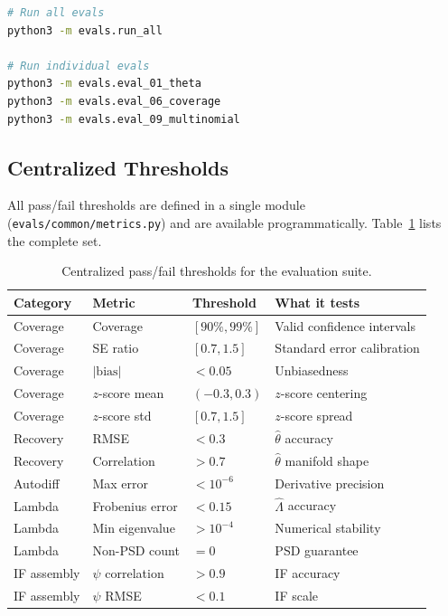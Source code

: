 \begin{lstlisting}[language=bash,numbers=none]
# Run all evals
python3 -m evals.run_all

# Run individual evals
python3 -m evals.eval_01_theta
python3 -m evals.eval_06_coverage
python3 -m evals.eval_09_multinomial
\end{lstlisting}

\subsection{Centralized Thresholds}\label{sec:thresholds}

All pass/fail thresholds are defined in a single module (\texttt{evals/common/metrics.py}) and are available programmatically. Table~\ref{tab:thresholds} lists the complete set.

\begin{table}[ht]
\centering
\caption{Centralized pass/fail thresholds for the evaluation suite.}\label{tab:thresholds}
\begin{tabular}{llll}
\toprule
\textbf{Category} & \textbf{Metric} & \textbf{Threshold} & \textbf{What it tests} \\
\midrule
Coverage    & Coverage          & $[90\%, 99\%]$       & Valid confidence intervals \\
Coverage    & SE ratio          & $[0.7, 1.5]$         & Standard error calibration \\
Coverage    & $|\text{bias}|$   & $< 0.05$             & Unbiasedness \\
Coverage    & $z$-score mean    & $(-0.3, 0.3)$        & $z$-score centering \\
Coverage    & $z$-score std     & $[0.7, 1.5]$         & $z$-score spread \\
\midrule
Recovery    & RMSE              & $< 0.3$              & $\hat{\theta}$ accuracy \\
Recovery    & Correlation       & $> 0.7$              & $\hat{\theta}$ manifold shape \\
\midrule
Autodiff    & Max error         & $< 10^{-6}$          & Derivative precision \\
\midrule
Lambda      & Frobenius error   & $< 0.15$             & $\hat{\Lambda}$ accuracy \\
Lambda      & Min eigenvalue    & $> 10^{-4}$          & Numerical stability \\
Lambda      & Non-PSD count     & $= 0$                & PSD guarantee \\
\midrule
IF assembly & $\psi$ correlation & $> 0.9$             & IF accuracy \\
IF assembly & $\psi$ RMSE       & $< 0.1$             & IF scale \\
\bottomrule
\end{tabular}
\end{table}
